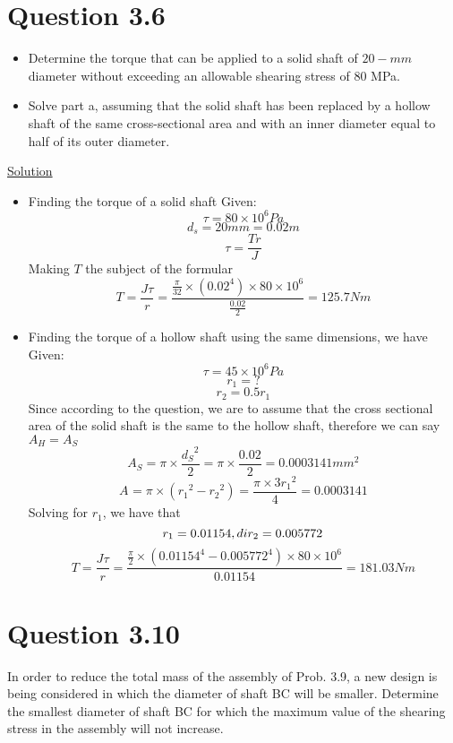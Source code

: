 \documentclass{article}
\begin{document}
\section*{Question 3.6}
\begin{itemize}
\item Determine the torque that can be applied to a solid shaft of $20-mm$ diameter without exceeding an allowable shearing stress of 80 MPa.
\item Solve part a, assuming that the solid shaft has been replaced by a hollow shaft of the same cross-sectional area and with an inner diameter equal to half of its outer diameter.
\end{itemize}
\begin{center}\underline{Solution}\end{center}
\begin{itemize}
\item Finding the torque of a solid shaft \newline
 Given: \[\tau = 80 \times 10^{6}Pa\]\[d_{s} = 20mm = 0.02m\]
\[\tau = \frac{{T}{r}}{J}\]
Making $ T$ the subject of the formular
\[T = \frac{J\tau}{r} = \frac{{\frac{\pi}{32}}\times(0.02^{4})\times 80 \times 10^{6}}{\frac{0.02}{2}} = 125.7Nm\]
\item Finding the torque of a hollow shaft using the same dimensions, we have\newline
Given: \[\tau = 45 \times 10^{6}Pa\]\[r_{1} = ?\]\[r_{2} = 0.5r_{1}\]
Since according to the question, we are to assume that the cross sectional area of the solid shaft is the same to the hollow shaft, therefore we can say $A_{H} = A_{S}$
\[A_{S} = \pi\times\frac{{d_{S}}^{2}}{2} = \pi\times\frac{0.02}{2} = 0.0003141mm^{2}\]
\[A_{} = \pi\times({r_{1}}^{2}-{r_{2}}^{2}) = \frac{\pi\times3{r_{1}}^{2}}{4} = 0.0003141\]
Solving for $r_{1}$, we have that 
\[r_{1} = 0.01154 \space \space \space ,di r_{2} = 0.005772\]
\[T = \frac{J\tau}{r} = \frac{{\frac{\pi}{2}}\times(0.01154^{4} - 0.005772^{4})\times 80 \times 10^{6}}{0.01154} = 181.03Nm\]
\end{itemize}


\section*{Question 3.10}
 In order to reduce the total mass of the assembly of Prob. 3.9, a new design is being considered in which the diameter of shaft BC will be smaller. Determine the smallest diameter of shaft BC for which the maximum value of the shearing stress in the assembly will not increase.
\end{document}
